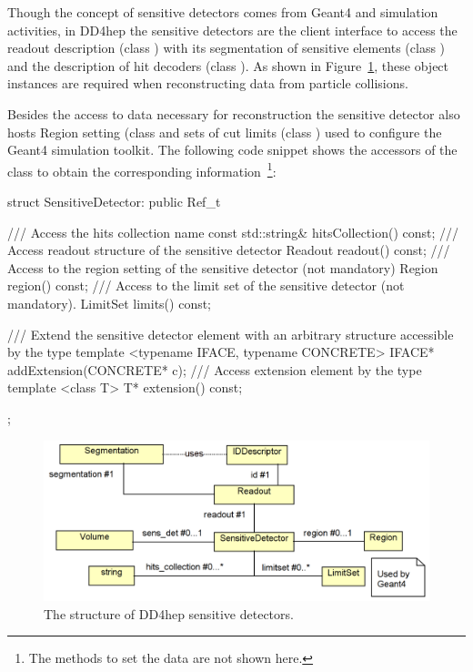 \documentclass[10pt,a4paper]{article}
\begin{document}
\noindent
Though the concept of sensitive detectors comes from Geant4 and simulation 
activities, in DD4hep the sensitive detectors are the client interface to 
access the readout description (class ) with its 
segmentation of sensitive elements (class ) and
the description of hit decoders (class ).
As shown in Figure~\ref{fig:dd4hep-sensitive-detectors}, these object 
instances are required when reconstructing data from particle collisions.

\noindent
Besides the access to data necessary for reconstruction the sensitive detector
also hosts Region setting (class  and sets of cut limits
(class ) used to configure the Geant4 simulation toolkit.
The following code snippet shows the accessors of the 
 class to obtain the corresponding 
information~\footnote{The methods to set the data are not shown here.}:


\vspace{0.3cm}
\begin{code}
    struct SensitiveDetector: public Ref_t {
      /// Access the hits collection name
      const std::string& hitsCollection() const;
      /// Access readout structure of the sensitive detector
      Readout readout() const;
      /// Access to the region setting of the sensitive detector (not mandatory)
      Region region() const;
      /// Access to the limit set of the sensitive detector (not mandatory).
      LimitSet limits() const;

      /// Extend the sensitive detector element with an arbitrary structure accessible by the type
      template <typename IFACE, typename CONCRETE> IFACE* addExtension(CONCRETE* c);
      /// Access extension element by the type
      template <class T> T* extension() const;
   };
\end{code}

\begin{figure}[h]
  \begin{center}
    \includegraphics[width=140mm] {DD4hep-sensitive-detectors}
    \caption{The structure of DD4hep sensitive detectors.}
    \label{fig:dd4hep-sensitive-detectors}
  \end{center}
  \vspace{-0.6cm}
\end{figure}
\end{document}
